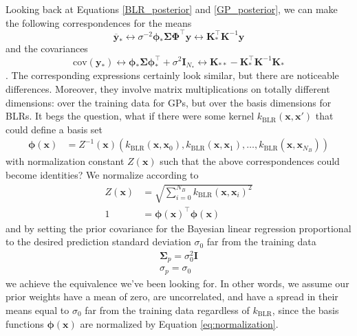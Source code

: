 \documentclass{article}
\begin{document}
Looking back at Equations \ref{BLR_posterior} and \ref{GP_posterior}, we can make the following correspondences for the means
\begin{equation}
    \overline{\mathbf{y}}_\ast\leftrightarrow\sigma^{-2}\boldsymbol{\phi}_\ast \boldsymbol{\Sigma} \boldsymbol{\Phi}^\top \mathbf{y} \leftrightarrow \mathbf{K}_\ast^\top \mathbf{K}^{-1} \mathbf{y}
\end{equation}
and the covariances
\begin{equation}
   \text{cov}(\mathbf{y}_\ast) \leftrightarrow \boldsymbol{\phi}_\ast\boldsymbol{\Sigma}\boldsymbol{\phi}_\ast^\top +\sigma^2 \mathbf{I}_{N_\ast}\leftrightarrow \mathbf{K}_{\ast\ast} - \mathbf{K}_\ast^\top \mathbf{K}^{-1} \mathbf{K}_\ast
\end{equation}.
The corresponding expressions certainly look similar, but there are noticeable differences. Moreover, they involve matrix multiplications on totally different dimensions: over the training data for GPs, but over the basis dimensions for BLRs. It begs the question, what if there were some kernel $k_\text{BLR}(\mathbf{x},\mathbf{x}')$ that could define a basis set 
\begin{equation}
\begin{split}
    \boldsymbol{\phi}(\mathbf{x})&=Z^{-1}(\mathbf{x})(k_\text{BLR}(\mathbf{x},\mathbf{x}_0),k_\text{BLR}(\mathbf{x},\mathbf{x}_1),\dots,k_\text{BLR}(\mathbf{x},\mathbf{x}_{N_B})) \end{split}
\end{equation}with normalization constant $Z(\mathbf{x})$ such that the above correspondences could become identities? We normalize according to
\begin{equation}
\label{eq:normalization}
\begin{split}
    Z(\mathbf{x}) &= \sqrt{\sum_{i=0}^{N_B}k_\text{BLR}(\mathbf{x},\mathbf{x}_i)^2} \\
    1 &= \boldsymbol{\phi}(\mathbf{x})^\top\boldsymbol{\phi}(\mathbf{x})
\end{split}
\end{equation}and by setting the prior covariance for the Bayesian linear regression proportional to the desired prediction standard deviation $\sigma_0$ far from the training data 
\begin{equation}
\label{eq:set_sigma_p_to_one}
\begin{split}
   \boldsymbol{\Sigma}_p=\sigma_0^2\mathbf{I}\\\sigma_p=\sigma_0
   \end{split}
\end{equation}we achieve the equivalence we've been looking for. In other words, we assume our prior weights have a mean of zero, are uncorrelated, and have a spread in their means equal to $\sigma_0$ far from the training data regardless of $k_\text{BLR}$, since the basis functions $\boldsymbol{\phi}(\mathbf{x})$ are normalized by Equation \ref{eq:normalization}. 
\end{document}
